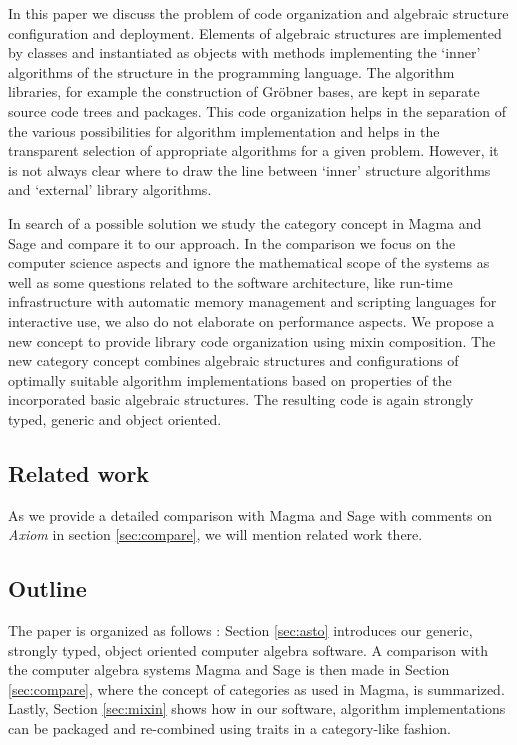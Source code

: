 \documentclass{llncs}
\begin{document}
In this paper we discuss the problem of code organization and
algebraic structure configuration and deployment. Elements of algebraic
structures are implemented by classes and instantiated as objects with
methods implementing the `inner' algorithms of the structure in the
programming language. The algorithm libraries, for example the
construction of Gr\"obner bases, are kept in separate source code trees
and packages. This code organization helps in the separation of the
various possibilities for algorithm implementation and helps in the
transparent selection of appropriate algorithms for a given problem.
However, it is not always clear where to draw the line between `inner'
structure algorithms and `external' library algorithms.

In search of a possible solution we study the category concept in
Magma \cite{BosmaCannonPlayoust:1997} and Sage \cite{Stein:2005} and
compare it to our approach. In the comparison we focus on the computer
science aspects and ignore the mathematical scope of the systems as
well as some questions related to the software architecture, like
run-time infrastructure with automatic memory management and scripting
languages for interactive use, we also do not elaborate on performance
aspects.
%
We propose a new concept to provide library code organization
using mixin composition. The new category concept combines algebraic
structures and configurations of optimally suitable algorithm
implementations based on properties of the incorporated basic
algebraic structures.  The resulting code is again strongly typed,
generic and object oriented.


\subsection{Related work} %

As we provide a detailed comparison with Magma
\cite{BosmaCannonPlayoust:1997} and Sage \cite{Stein:2005} with
comments on {\em Axiom} \cite{JenksSutor:1992,Watt:2003} in section
\ref{sec:compare}, we will mention related work there.


\subsection{Outline} %

The paper is organized as follows : Section \ref{sec:asto} introduces
our generic, strongly typed, object oriented computer algebra
software. A comparison with the computer algebra systems Magma and
Sage is then made in Section \ref{sec:compare}, where the concept of
categories as used in Magma, is summarized. Lastly, Section
\ref{sec:mixin} shows how in our software, algorithm implementations
can be packaged and re-combined using traits in a category-like
fashion.
\end{document}
